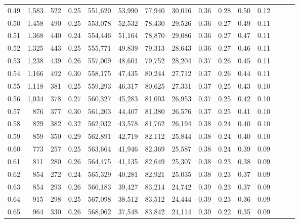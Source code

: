 \begin{tabular}{rrrrrrrrrrrrrrr}
0.49 &   1,583 &    522 &  0.25 &  551,620 &   53,990 &   77,940 &   30,016 &  0.36 &  0.28 &  0.50 &      0.12 \\
0.50 &   1,458 &    490 &  0.25 &  553,078 &   52,532 &   78,430 &   29,526 &  0.36 &  0.27 &  0.49 &      0.11 \\
0.51 &   1,368 &    440 &  0.24 &  554,446 &   51,164 &   78,870 &   29,086 &  0.36 &  0.27 &  0.47 &      0.11 \\
0.52 &   1,325 &    443 &  0.25 &  555,771 &   49,839 &   79,313 &   28,643 &  0.36 &  0.27 &  0.46 &      0.11 \\
0.53 &   1,238 &    439 &  0.26 &  557,009 &   48,601 &   79,752 &   28,204 &  0.37 &  0.26 &  0.45 &      0.11 \\
0.54 &   1,166 &    492 &  0.30 &  558,175 &   47,435 &   80,244 &   27,712 &  0.37 &  0.26 &  0.44 &      0.11 \\
0.55 &   1,118 &    381 &  0.25 &  559,293 &   46,317 &   80,625 &   27,331 &  0.37 &  0.25 &  0.43 &      0.10 \\
0.56 &   1,034 &    378 &  0.27 &  560,327 &   45,283 &   81,003 &   26,953 &  0.37 &  0.25 &  0.42 &      0.10 \\
0.57 &     876 &    377 &  0.30 &  561,203 &   44,407 &   81,380 &   26,576 &  0.37 &  0.25 &  0.41 &      0.10 \\
0.58 &     829 &    382 &  0.32 &  562,032 &   43,578 &   81,762 &   26,194 &  0.38 &  0.24 &  0.40 &      0.10 \\
0.59 &     859 &    350 &  0.29 &  562,891 &   42,719 &   82,112 &   25,844 &  0.38 &  0.24 &  0.40 &      0.10 \\
0.60 &     773 &    257 &  0.25 &  563,664 &   41,946 &   82,369 &   25,587 &  0.38 &  0.24 &  0.39 &      0.09 \\
0.61 &     811 &    280 &  0.26 &  564,475 &   41,135 &   82,649 &   25,307 &  0.38 &  0.23 &  0.38 &      0.09 \\
0.62 &     854 &    272 &  0.24 &  565,329 &   40,281 &   82,921 &   25,035 &  0.38 &  0.23 &  0.37 &      0.09 \\
0.63 &     854 &    293 &  0.26 &  566,183 &   39,427 &   83,214 &   24,742 &  0.39 &  0.23 &  0.37 &      0.09 \\
0.64 &     915 &    298 &  0.25 &  567,098 &   38,512 &   83,512 &   24,444 &  0.39 &  0.23 &  0.36 &      0.09 \\
0.65 &     964 &    330 &  0.26 &  568,062 &   37,548 &   83,842 &   24,114 &  0.39 &  0.22 &  0.35 &      0.09 \\

\end{tabular}
